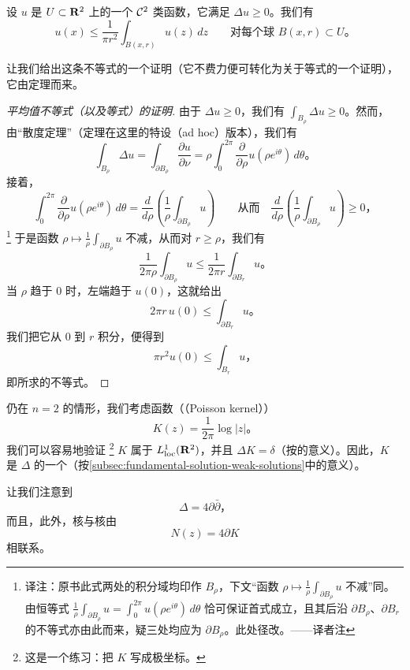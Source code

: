 \begin{proposition}[平均值不等式]\label{thm:appC-mean-value-inequality}
设 $u$ 是 $U\subset\mathbf{R}^{2}$ 上的一个 $\mathcal{C}^{2}$ 类函数，它满足 $\Delta u\ge0$。我们有
\[
u(x)\le\frac{1}{\pi r^{2}}\int_{B(x,r)}u(z)\,dz
\qquad\text{对每个球 } B(x,r)\subset U\text{。}
\]
\end{proposition}

让我们给出这条不等式的一个证明（它不费力便可转化为关于等式的一个证明），它由\trStokes{}定理而来。

\begin{proof}[平均值不等式（以及等式）的证明]
由于 $\Delta u\ge0$，我们有 $\int_{B_{\rho}}\Delta u\ge0$。然而，由“散度定理”（\trStokes{}定理在这里的特设（ad hoc）版本），我们有
\[
\int_{B_{\rho}}\Delta u=\int_{\partial B_{\rho}}\frac{\partial u}{\partial\nu}
=\rho\int_{0}^{2\pi}\frac{\partial}{\partial\rho}u(\rho e^{i\theta})\,d\theta\text{。}
\]
接着，
\[
\int_{0}^{2\pi}\frac{\partial}{\partial\rho}u(\rho e^{i\theta})\,d\theta
=\frac{d}{d\rho}\left(\frac{1}{\rho}\int_{\partial B_{\rho}}u\right)
\qquad\text{从而}\quad
\frac{d}{d\rho}\left(\frac{1}{\rho}\int_{\partial B_{\rho}}u\right)\ge 0\text{，}
\]
\footnote{译注：原书此式两处的积分域均印作 $B_{\rho}$，下文“函数 $\rho\mapsto\frac{1}{\rho}\int_{\partial B_{\rho}}u$ \trMonotone{}不减”同。由恒等式 $\frac{1}{\rho}\int_{\partial B_{\rho}}u=\int_{0}^{2\pi}u(\rho e^{i\theta})\,d\theta$ 恰可保证首式成立，且其后沿 $\partial B_{\rho}$、$\partial B_{r}$ 的不等式亦由此而来，疑三处均应为 $\partial B_{\rho}$。此处径改。——译者注}
于是函数 $\rho\mapsto\frac{1}{\rho}\int_{\partial B_{\rho}}u$ \trMonotone{}不减，从而对 $r\ge\rho$，我们有
\[
\frac{1}{2\pi\rho}\int_{\partial B_{\rho}}u\le\frac{1}{2\pi r}\int_{\partial B_{r}}u\text{。}
\]
当 $\rho$ 趋于 $0$ 时，左端趋于 $u(0)$，这就给出
\[
2\pi r\,u(0)\le\int_{\partial B_{r}}u\text{。}
\]
我们把它从 $0$ 到 $r$ 积分，便得到
\[
\pi r^{2}u(0)\le\int_{B_{r}}u\text{，}
\]
即所求的不等式。
\end{proof}

仍在 $n=2$ 的情形，我们考虑函数（\trPoissonKernel（Poisson kernel））
\[
K(z)=\frac{1}{2\pi}\log|z|\text{。}
\]
我们可以容易地验证%
\footnote{这是一个练习：把 $K$ 写成极坐标。}
$K$ 属于 $L^{1}_{\mathrm{loc}}(\mathbf{R}^{2})$，并且 $\Delta K=\delta$（按\trDistribution{}的意义）。因此，$K$ 是 $\Delta$ 的一个\trFundamentalSolution（按\cref{subsec:fundamental-solution-weak-solutions}中的意义）。

让我们注意到
\[
\Delta=4\partial\bar{\partial}\text{，}
\]
而且，此外，\trPoisson{}核与\trCauchy{}核由
\[
N(z)=4\partial K
\]
相联系。

